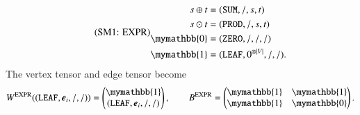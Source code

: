 \documentclass[onefignum, onetabnum]{siamart190516}
\newcommand{\eqname}[1]{\stepcounter{equation}\tag{\theequation : #1}}
\newcommand{\<}{\langle}
\renewcommand{\>}{\rangle}
\begin{document}
\begin{equation}
\eqname{EXPR}
\begin{split}
    s \oplus t &= (\texttt{SUM}, /, s, t)\\
    s \odot t &= (\texttt{PROD}, /, s, t)\\
    \mymathbb{0} &= (\texttt{ZERO}, /, /, /)\\
    \mymathbb{1} &= (\texttt{LEAF}, 0^{\otimes |V|}, /, /).
\end{split}\label{eq:expr}
\end{equation}
The vertex tensor and edge tensor become
\begin{equation}
    W^{\rm EXPR}((\texttt{LEAF},\boldsymbol{e}_i,/,/)) = \left(\begin{matrix}
        \mymathbb{1} \\
        (\texttt{LEAF},\boldsymbol{e}_i,/,/)
    \end{matrix}\right),   
    \qquad
        B^{\rm EXPR} = \left(\begin{matrix}
        \mymathbb{1}  & \mymathbb{1} \\
        \mymathbb{1} & \mymathbb{0}
    \end{matrix}\right).
\end{equation}
\end{document}
